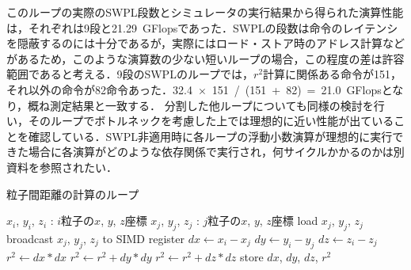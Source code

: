 \documentclass[uplatex,11pt,a4j,titlepage,oneside,openright,dvipdfmx]{jsbook}
\begin{document}
このループの実際のSWPL段数とシミュレータの実行結果から得られた演算性能は，それぞれは9段と\mbox{21.29 GFlops}であった．SWPLの段数は命令のレイテンシを隠蔽するのには十分であるが，実際にはロード・ストア時のアドレス計算などがあるため，このような演算数の少ない短いループの場合，この程度の差は許容範囲であると考える．9段のSWPLのループでは，$r^2$計算に関係ある命令が151，それ以外の命令が82命令あった．\mbox{32.4 $\times$ 151 / (151 + 82) = 21.0 GFlops}となり，概ね測定結果と一致する．
分割した他ループについても同様の検討を行い，そのループでボトルネックを考慮した上では理想的に近い性能が出ていることを確認している．SWPL非適用時に各ループの浮動小数演算が理想的に実行できた場合に各演算がどのような依存関係で実行され，何サイクルかかるのかは別資料を参照されたい．


\begin{algorithm}
 \caption{粒子間距離の計算のループ} \label{algo:r2}
  \begin{algorithmic}
   \Require
   \State $x_i$, $y_i$, $z_i$ : $i$粒子の$x$, $y$, $z$座標
   \State $x_j$, $y_j$, $z_j$ : $j$粒子の$x$, $y$, $z$座標
   \State load $x_j$, $y_j$, $z_j$
   \State broadcast $x_j$, $y_j$, $z_j$ to SIMD register
   \State $dx \leftarrow x_i - x_j$
   \State $dy \leftarrow y_i - y_j$
   \State $dz \leftarrow z_i - z_j$
   \State $r^2 \leftarrow dx*dx$
   \State $r^2 \leftarrow r^2 + dy*dy$
   \State $r^2 \leftarrow r^2 + dz*dz$
   \State store $dx$, $dy$, $dz$, $r^2$
   \EndFunction
  \end{algorithmic}
\end{algorithm}
\end{document}
